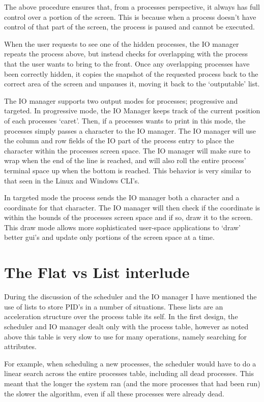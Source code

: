 \documentclass[a4paper]{report}
\begin{document}
The above procedure ensures that, from a processes perspective, it always has full control over a portion of the screen. This is because when a process doesn't have control of that part of the screen, the process is paused and cannot be executed.

When the user requests to see one of the hidden processes, the IO manager repeats the process above, but instead checks for overlapping with the process that the user wants to bring to the front. Once any overlapping processes have been correctly hidden, it copies the snapshot of the requested process back to the correct area of the screen and unpauses it, moving it back to the `outputable' list.

The IO manager supports two output modes for processes; progressive and targeted. In progressive mode, the  IO Manager keeps track of the current position of each processes `caret'. Then, if a processes wants to print in this mode, the processes simply passes a character to the IO manager. The IO manager will use the column and row fields of the IO part of the process entry to place the character within the processes screen space. The IO manager will make sure to wrap when the end of the line is reached, and will also roll the entire process' terminal space up when the bottom is reached. This behavior is very similar to that seen in the Linux and Windows CLI's.

In targeted mode the process sends the IO manager both a character and a coordinate for that character. The IO manager will then check if the coordinate is within the bounds of the processes screen space and if so, draw it to the screen. This draw mode allows more sophisticated user-space applications to `draw' better gui's and update only portions of the screen space at a time.

\section{The Flat vs List interlude}

During the discussion of the scheduler and the IO manager I have mentioned the use of lists to store PID's in a number of situations. These lists are an acceleration structure over the process table its self. In the first design, the scheduler and IO manager dealt only with the process table, however as noted above this table is very slow to use for many operations, namely searching for attributes.

For example, when scheduling a new processes, the scheduler would have to do a linear search across the entire processes table, including all dead processes. This meant that the longer the system ran (and the more processes that had been run) the slower the algorithm, even if all these processes were already dead.
\end{document}
